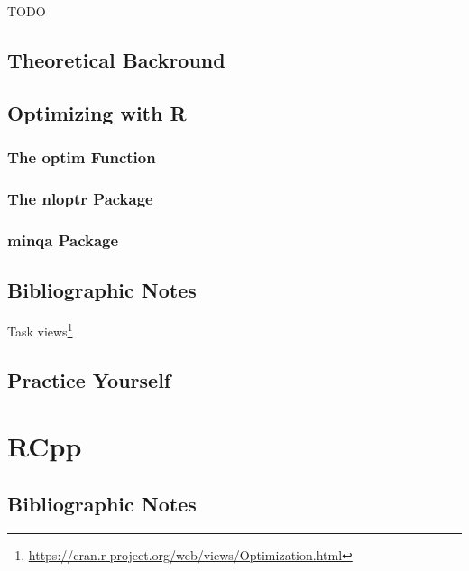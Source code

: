 \documentclass[]{book}
\renewcommand{\href}[2]{#2\footnote{\url{#1}}}
\theoremstyle{definition}
\theoremstyle{definition}
\theoremstyle{definition}
\theoremstyle{remark}
\begin{document}
TODO

\hypertarget{theoretical-backround}{%
\section{Theoretical Backround}\label{theoretical-backround}}

\hypertarget{optimizing-with-r}{%
\section{Optimizing with R}\label{optimizing-with-r}}

\hypertarget{the-optim-function}{%
\subsection{The optim Function}\label{the-optim-function}}

\hypertarget{the-nloptr-package}{%
\subsection{The nloptr Package}\label{the-nloptr-package}}

\hypertarget{minqa-package}{%
\subsection{minqa Package}\label{minqa-package}}

\hypertarget{bibliographic-notes-16}{%
\section{Bibliographic Notes}\label{bibliographic-notes-16}}

\href{https://cran.r-project.org/web/views/Optimization.html}{Task views}

\hypertarget{practice-yourself-14}{%
\section{Practice Yourself}\label{practice-yourself-14}}

\hypertarget{rcpp}{%
\chapter{RCpp}\label{rcpp}}

\hypertarget{bibliographic-notes-17}{%
\section{Bibliographic Notes}\label{bibliographic-notes-17}}
\end{document}

